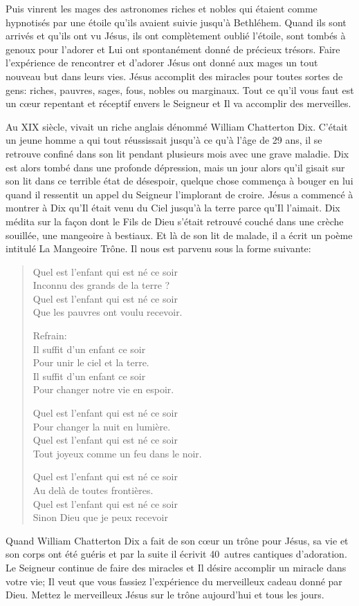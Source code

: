 Puis vinrent les mages \ocadr des astronomes riches et nobles qui étaient comme hypnotisés par une étoile qu'ils avaient suivie jusqu'à Bethléhem. Quand ils sont arrivés et qu'ils ont vu Jésus, ils ont complètement oublié l'étoile, sont tombés à genoux pour l'adorer et Lui ont spontanément donné de précieux trésors. Faire l'expérience de rencontrer et d'adorer Jésus ont donné aux mages un tout nouveau but dans leurs vies. Jésus accomplit des miracles pour toutes sortes de gens: riches, pauvres, sages, fous, nobles ou marginaux. Tout ce qu'il vous faut est un cœur repentant et réceptif envers le Seigneur et Il va accomplir des merveilles.

Au XIX siècle, vivait un riche anglais dénommé William Chatterton Dix. C'était un jeune homme a qui tout réussissait jusqu'à ce qu'à l'âge de 29 ans, il se retrouve confiné dans son lit pendant plusieurs mois avec une grave maladie. Dix est alors tombé dans une profonde dépression, mais un jour alors qu'il gisait sur son lit dans ce terrible état de désespoir, quelque chose commença à bouger en lui quand il ressentit un appel du Seigneur l'implorant de croire. Jésus a commencé à montrer à Dix qu'Il était venu du Ciel jusqu'à la terre parce qu'Il l'aimait. Dix médita sur la façon dont le Fils de Dieu s'était retrouvé couché dans une crèche souillée, une mangeoire à bestiaux. Et là de son lit de malade, il a écrit un poème intitulé La Mangeoire Trône. Il nous est parvenu sous la forme suivante:

\begin{verse}
Quel est l'enfant qui est né ce soir\\
Inconnu des grands de la terre ?\\
Quel est l'enfant qui est né ce soir\\
Que les pauvres ont voulu recevoir.

Refrain:\\
Il suffit d'un enfant ce soir\\
Pour unir le ciel et la terre.\\
Il suffit d'un enfant ce soir\\
Pour changer notre vie en espoir.

Quel est l'enfant qui est né ce soir\\
Pour changer la nuit en lumière.\\
Quel est l'enfant qui est né ce soir\\
Tout joyeux comme un feu dans le noir.

Quel est l'enfant qui est né ce soir\\
Au delà de toutes frontières.\\
Quel est l'enfant qui est né ce soir\\
Sinon Dieu que je peux recevoir
\end{verse}

Quand William Chatterton Dix a fait de son cœur un trône pour Jésus, sa vie et son corps ont été guéris et par la suite il écrivit 40~autres cantiques d'adoration. Le Seigneur continue de faire des miracles et Il désire accomplir un miracle dans votre vie; Il veut que vous fassiez l'expérience du merveilleux cadeau donné par Dieu. Mettez le merveilleux Jésus sur le trône aujourd'hui et tous les jours.

